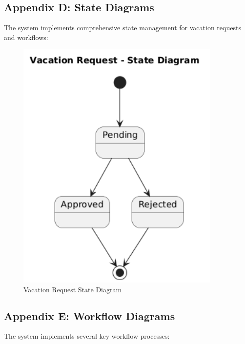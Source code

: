 \documentclass[12pt,a4paper]{article}
\begin{document}
\subsection{Appendix D: State Diagrams}
The system implements comprehensive state management for vacation requests and workflows:

\begin{figure}[H]
\centering
\includegraphics[width=0.9\textwidth]{Diagrams/State-Diagram/State-Diagram.png}
\caption{Vacation Request State Diagram}
\label{fig:state-diagram}
\end{figure}

\subsection{Appendix E: Workflow Diagrams}
The system implements several key workflow processes:
\end{document}
